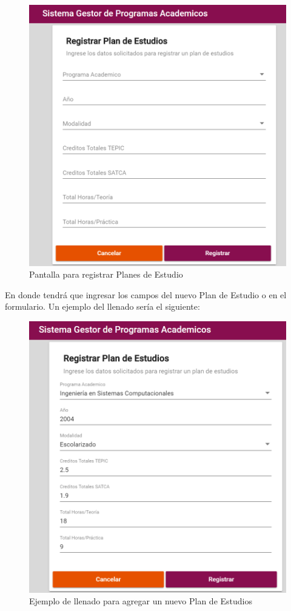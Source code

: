\begin{figure}[!hbtp]
	\centering
	\hypertarget{registrarPE}{\includegraphics[width=0.7\linewidth]{images/SP4-GPE/registrarPE}}
	\caption{Pantalla para registrar Planes de Estudio}
	\label{registrarPE}
\end{figure}
\newpage
En donde tendrá que ingresar los campos del nuevo Plan de Estudio o en el formulario. Un ejemplo del llenado sería el siguiente:

\begin{figure}[!hbtp]
	\centering
	\hypertarget{ejreg}{\includegraphics[width=0.7\linewidth]{images/SP4-GPE/registrarEjem}}
	\caption{Ejemplo de llenado para agregar un nuevo Plan de Estudios}
	\label{ejreg}
\end{figure}

